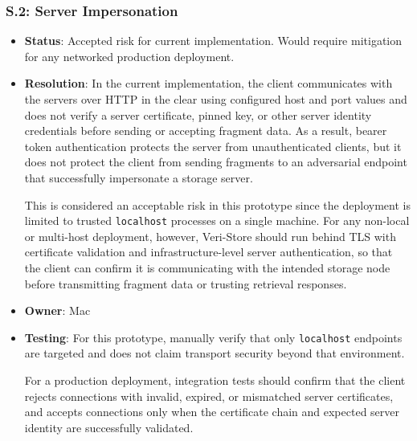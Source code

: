 \documentclass[../veristore_security_model.tex]{subfiles}
\begin{document}
\subsubsection{S.2: Server Impersonation}
\begin{itemize}
    \item \textbf{Status}: Accepted risk for current implementation. Would require mitigation for any networked production deployment.
    \item \textbf{Resolution}: In the current implementation, the client communicates with the servers over HTTP in the clear using configured host and port values and does not verify a server certificate, pinned key, or other server identity credentials before sending or accepting fragment data. As a result, bearer token authentication protects the server from unauthenticated clients, but it does not protect the client from sending fragments to an adversarial endpoint that successfully impersonate a storage server.
    
    This is considered an acceptable risk in this prototype since the deployment is limited to trusted \texttt{localhost} processes on a single machine. For any non-local or multi-host deployment, however, Veri-Store should run behind TLS with certificate validation and infrastructure-level server authentication, so that the client can confirm it is communicating with the intended storage node before transmitting fragment data or trusting retrieval responses.
    \item \textbf{Owner}: Mac
    \item \textbf{Testing}: For this prototype, manually verify that only \texttt{localhost} endpoints are targeted and does not claim transport security beyond that environment.
    
    For a production deployment, integration tests should confirm that the client rejects connections with invalid, expired, or mismatched server certificates, and accepts connections only when the certificate chain and expected server identity are successfully validated.
\end{itemize}
\end{document}
